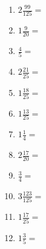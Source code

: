 \documentclass[12pt]{article}
\begin{document}
\begin{enumerate}
\item \large $ 2 \frac{99}{125} = $ \vspace{1.5cm}
\item \large $ 1 \frac{9}{20} = $ \vspace{1.5cm}
\newpage
\item \large $ \frac{4}{5} = $ \vspace{1.5cm}
\item \large $ 2 \frac{21}{25} = $ \vspace{1.5cm}
\item \large $ 1 \frac{18}{25} = $ \vspace{1.5cm}
\item \large $ 1 \frac{13}{25} = $ \vspace{1.5cm}
\item \large $ 1 \frac{1}{4} = $ \vspace{1.5cm}
\item \large $ 2 \frac{17}{20} = $ \vspace{1.5cm}
\item \large $ \frac{3}{4} = $ \vspace{1.5cm}
\item \large $ 3 \frac{123}{125} = $ \vspace{1.5cm}
\item \large $ 1 \frac{17}{25} = $ \vspace{1.5cm}
\item \large $ 1 \frac{3}{5} = $ \vspace{1.5cm}
\end{enumerate}\newpage
\end{document}
